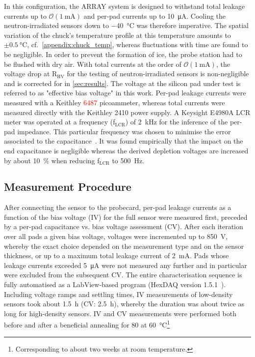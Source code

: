 In this configuration, the ARRAY system is designed to withstand total leakage currents up to $\mathcal{O}(\SI{1}{\milli\ampere})$ and per-pad currents up to \SI{10}{\micro\ampere}.
Cooling the neutron-irradiated sensors down to \SI{-40}{\celsius} was therefore imperative.
The spatial variation of the chuck's temperature profile at this temperature amounts to $\pm\SI{0.5}{\celsius}$, cf.~\ref{appendix:chuck_temp}, whereas fluctuations with time are found to be negligible. 
In order to prevent the formation of ice, the probe station had to be flushed with dry air. 
With total currents at the order of $\mathcal{O}(\SI{1}{\milli\ampere})$, the voltage drop at R$_\text{HV}$ for the testing of neutron-irradiated sensors is non-negligible and is corrected for in \ref{sec:results}.
The voltage at the silicon pad under test is referred to as "effective bias voltage" in this work.
Per-pad leakage currents were measured with a Keithley \textcolor{red}{6487} picoammeter, whereas total currents were measured directly with the Keithley 2410 power supply.
A Keysight E4980A LCR meter was operated at a frequency (f$_\text{LCR}$) of \SI{2}{\kilo\hertz} for the inference of the per-pad impedance.
This particular frequency was chosen to minimise the error associated to the capacitance~\cite{pitters:array2019}.
It was found empirically that the impact on the end capacitance is negligible whereas the derived depletion voltages are increased by about \SI{10}{\percent} when reducing f$_\text{LCR}$ to \SI{500}{\hertz}. 

\subsection{Measurement Procedure}
\label{subsec:setup_procedure}
After connecting the sensor to the probecard, per-pad leakage currents as a function of the bias voltage (IV) for the full sensor were measured first, preceded by a per-pad capacitance vs. bias voltage assessment (CV).
After each iteration over all pads a given bias voltage, voltages were incremented up to \SI{850}{\volt}, whereby the exact choice depended on the measurement type and on the sensor thickness, or up to a maximum total leakage current of \SI{2}{\milli\ampere}.  
Pads whose leakage currents exceeded \SI{5}{\micro\ampere} were not measured any further and in particular were excluded from the subsequent CV.
The entire characterisation sequence is fully automatised as a LabView-based program (HexDAQ version 1.5.1~\cite{labview_hexdaq}).
Including voltage ramps and settling times, IV measurements of low-density sensors took about \SI{1.5}{\hour} (CV: \SI{2.5}{\hour}), whereby the duration was about twice as long for high-density sensors.
IV and CV measurements were performed both before and after a beneficial annealing for \SI{80}{\min} at \SI{60}{\celsius}\footnote{Corresponding to about two weeks at room temperature.}